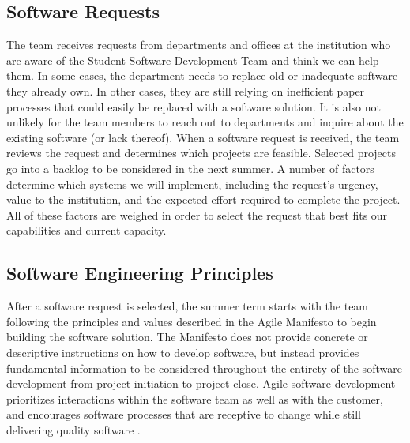 
\subsection{Software Requests}
The team receives requests from departments and offices at the institution who are aware of the Student Software Development Team and think we can help them. In some cases, the department needs to replace old or inadequate software they already own. In other cases, they are still relying on inefficient paper processes that could easily be replaced with a software solution. It is also not unlikely for the team members to reach out to departments and inquire about the existing software (or lack thereof).  When a software request is received, the team reviews the request and determines which projects are feasible. Selected projects go into a backlog to be considered in the next summer. A number of factors determine which systems we will implement, including the request's urgency, value to the institution, and the expected effort required to complete the project. All of these factors are weighed in order to select the request that best fits our capabilities and current capacity.

\subsection{Software Engineering Principles}
After a software request is selected, the summer term starts with the team following the principles and values described in the Agile Manifesto to begin building the software solution. The Manifesto does not provide concrete or descriptive instructions on how to develop software, but instead provides fundamental information to be considered throughout the entirety of the software development from project initiation to project close. Agile software development prioritizes interactions within the software team as well as with the customer, and encourages software processes that are receptive to change while still delivering quality software \cite{agilemanifesto}. %

